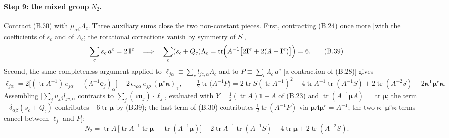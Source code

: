\paragraph{Step 9: the mixed group $N_2$.}
Contract (B.30) with $\mu_{\alpha\beta}\Lambda_c$. Three auxiliary sums close the two non-constant pieces. First, contracting (B.24) once more [with the coefficients of $s_c$ and of $\Lambda_c$; the rotational corrections vanish by symmetry of $S$],
\begin{equation}
\sum_c s_c\,a^{c}=2\,\mathbf I^{e}
\quad\Longrightarrow\quad
\sum_c(s_c+Q_c)\Lambda_c
=\operatorname{tr}\Bigl(A^{-1}\bigl[2\mathbf I^{e}+2(A-\mathbf I^{e})\bigr]\Bigr)=6 . \tag{B.39}
\end{equation}
Second, the same completeness argument applied to $\ell_{j\alpha}\equiv\sum_cl_{jc,\alpha}\Lambda_c$ and to $P\equiv\sum_c\Lambda_c\,a^{c}$ [a contraction of (B.28)] gives
\begin{equation}
\ell_{j\alpha}=2\bigl[(\operatorname{tr}A^{-1})\,e_{j\alpha}-(A^{-1}\mathbf e_j)_{\alpha}\bigr]+2\,\epsilon_{\gamma\rho\alpha}\,e_{j\rho}\,(\boldsymbol\mu^{e}\boldsymbol\kappa)_{\gamma}\, ,
\qquad
\tfrac12\operatorname{tr}\bigl(A^{-1}P\bigr)
=2\operatorname{tr}S(\operatorname{tr}A^{-1})^{2}-4\operatorname{tr}A^{-1}\operatorname{tr}(A^{-1}S)+2\operatorname{tr}(A^{-2}S)-2\boldsymbol\kappa^{\mathsf T}\boldsymbol\mu^{e}\boldsymbol\kappa . \tag{B.40}
\end{equation}
Assembling [$\sum_ju_{j\beta}l_{jc,\alpha}$ contracts to $\sum_j(\boldsymbol\mu\mathbf u_j)\cdot\boldsymbol\ell_j$, evaluated with $Y=\tfrac12(\operatorname{tr}A)\mathbb 1-A$ of (B.23) and $\operatorname{tr}(A^{-1}\boldsymbol\mu A)=\operatorname{tr}\boldsymbol\mu$; the term $-\delta_{\alpha\beta}(s_c+Q_c)$ contributes $-6\operatorname{tr}\boldsymbol\mu$ by (B.39); the last term of (B.30) contributes $\tfrac12\operatorname{tr}(A^{-1}P)$ via $\boldsymbol\mu A\boldsymbol\mu^{e}=A^{-1}$; the two $\boldsymbol\kappa^{\mathsf T}\boldsymbol\mu^{e}\boldsymbol\kappa$ terms cancel between $\boldsymbol\ell_j$ and $P$]:
\begin{equation}
N_2=\operatorname{tr}A\,\bigl[\operatorname{tr}A^{-1}\operatorname{tr}\boldsymbol\mu-\operatorname{tr}(A^{-1}\boldsymbol\mu)\bigr]
-2\operatorname{tr}A^{-1}\operatorname{tr}(A^{-1}S)-4\operatorname{tr}\boldsymbol\mu+2\operatorname{tr}(A^{-2}S) . \tag{B.41}
\end{equation}

